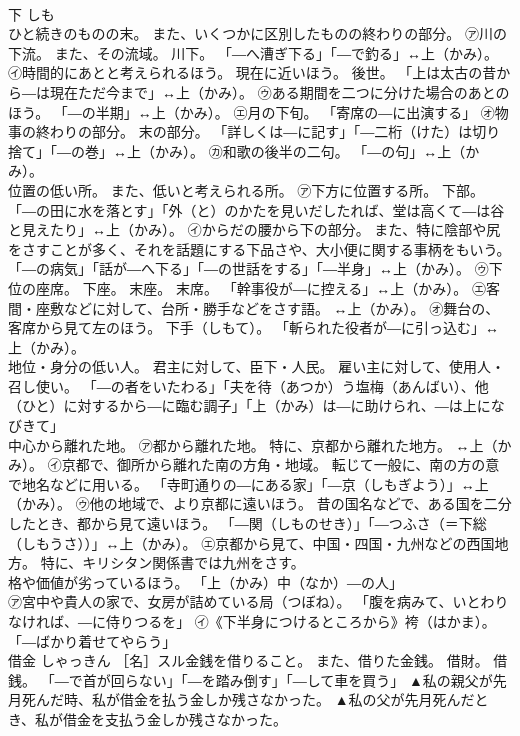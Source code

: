 \documentclass[8pt]{extreport}
\begin{document}
\begin{CJK}{UTF8}{min}
\\	下	しも	
\\	ひと続きのものの末。 また、いくつかに区別したものの終わりの部分。 ㋐川の下流。 また、その流域。 川下。 「―へ漕ぎ下る」「―で釣る」↔上（かみ）。 ㋑時間的にあとと考えられるほう。 現在に近いほう。 後世。 「上は太古の昔から―は現在ただ今まで」↔上（かみ）。 ㋒ある期間を二つに分けた場合のあとのほう。 「―の半期」↔上（かみ）。 ㋓月の下旬。 「寄席の―に出演する」 ㋔物事の終わりの部分。 末の部分。 「詳しくは―に記す」「―二桁（けた）は切り捨て」「―の巻」↔上（かみ）。 ㋕和歌の後半の二句。 「―の句」↔上（かみ）。 
\\	位置の低い所。 また、低いと考えられる所。 ㋐下方に位置する所。 下部。 「―の田に水を落とす」「外（と）のかたを見いだしたれば、堂は高くて―は谷と見えたり」↔上（かみ）。 ㋑からだの腰から下の部分。 また、特に陰部や尻をさすことが多く、それを話題にする下品さや、大小便に関する事柄をもいう。 「―の病気」「話が―へ下る」「―の世話をする」「―半身」↔上（かみ）。 ㋒下位の座席。 下座。 末座。 末席。 「幹事役が―に控える」↔上（かみ）。 ㋓客間・座敷などに対して、台所・勝手などをさす語。 ↔上（かみ）。 ㋔舞台の、客席から見て左のほう。 下手（しもて）。 「斬られた役者が―に引っ込む」↔上（かみ）。 
\\	地位・身分の低い人。 君主に対して、臣下・人民。 雇い主に対して、使用人・召し使い。 「―の者をいたわる」「夫を待（あつか）う塩梅（あんばい）、他（ひと）に対するから―に臨む調子」「上（かみ）は―に助けられ、―は上になびきて」 
\\	中心から離れた地。 ㋐都から離れた地。 特に、京都から離れた地方。 ↔上（かみ）。 ㋑京都で、御所から離れた南の方角・地域。 転じて一般に、南の方の意で地名などに用いる。 「寺町通りの―にある家」「―京（しもぎよう）」↔上（かみ）。 ㋒他の地域で、より京都に遠いほう。 昔の国名などで、ある国を二分したとき、都から見て遠いほう。 「―関（しものせき）」「―つふさ（＝下総（しもうさ））」↔上（かみ）。 ㋓京都から見て、中国・四国・九州などの西国地方。 特に、キリシタン関係書では九州をさす。 
\\	格や価値が劣っているほう。 「上（かみ）中（なか）―の人」 
\\	㋐宮中や貴人の家で、女房が詰めている局（つぼね）。 「腹を病みて、いとわりなければ、―に侍りつるを」 ㋑《下半身につけるところから》袴（はかま）。 「―ばかり着せてやらう」	
\\	借金	しゃっきん	［名］スル金銭を借りること。 また、借りた金銭。 借財。 借銭。 「―で首が回らない」「―を踏み倒す」「―して車を買う」	▲私の親父が先月死んだ時、私が借金を払う金しか残さなかった。 ▲私の父が先月死んだとき、私が借金を支払う金しか残さなかった。

\end{CJK}
\end{document}

